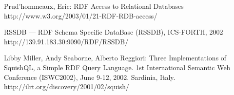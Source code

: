 \documentclass{llncs}
\begin{document}
\begin{thebibliography}{19}
Prud'hommeaux, Eric:
RDF Access to Relational Databases\\
http://www.w3.org/2003/01/21-RDF-RDB-access/

RSSDB --- RDF Schema Specific DataBase (RSSDB), ICS-FORTH, 2002\\
http://139.91.183.30:9090/RDF/RSSDB/

Libby Miller, Andy Seaborne, Alberto Reggiori:
Three Implementations of SquishQL, a Simple RDF Query Language. 1st
International Semantic Web Conference (ISWC2002), June 9-12, 2002. Sardinia,
Italy.\\
http://ilrt.org/discovery/2001/02/squish/

\end{thebibliography}
\end{document}
